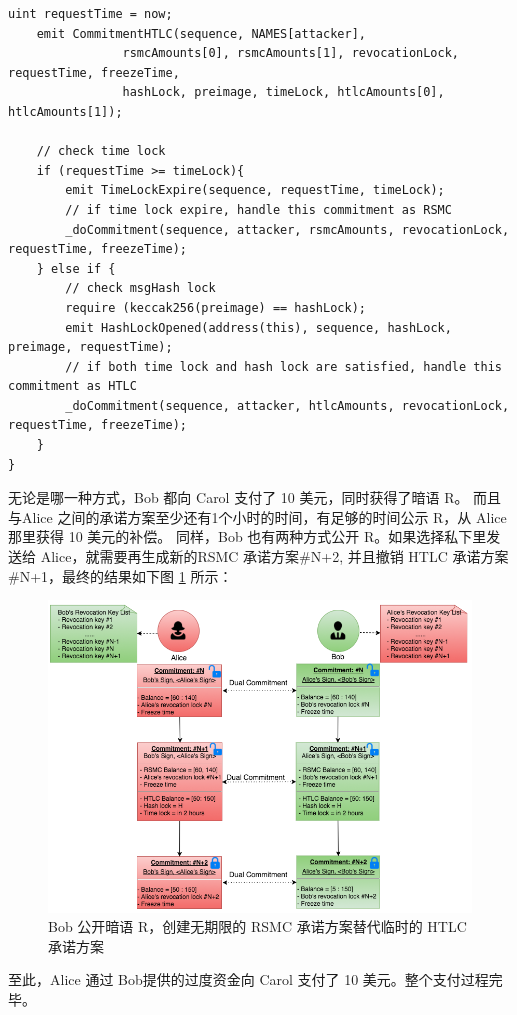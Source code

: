 \begin{appendices}
\begin{lstlisting}[caption={兑现HTLC共同承诺}, label={lst:cashHtlc}]
    uint requestTime = now;
    emit CommitmentHTLC(sequence, NAMES[attacker], 
                rsmcAmounts[0], rsmcAmounts[1], revocationLock, requestTime, freezeTime,
                hashLock, preimage, timeLock, htlcAmounts[0], htlcAmounts[1]);
    
    // check time lock
    if (requestTime >= timeLock){
        emit TimeLockExpire(sequence, requestTime, timeLock);
        // if time lock expire, handle this commitment as RSMC
        _doCommitment(sequence, attacker, rsmcAmounts, revocationLock, requestTime, freezeTime);
    } else if {
        // check msgHash lock
        require (keccak256(preimage) == hashLock);
        emit HashLockOpened(address(this), sequence, hashLock, preimage, requestTime);
        // if both time lock and hash lock are satisfied, handle this commitment as HTLC
        _doCommitment(sequence, attacker, htlcAmounts, revocationLock, requestTime, freezeTime);
    }
}
\end{lstlisting}

无论是哪一种方式，Bob 都向 Carol 支付了 10 美元，同时获得了暗语 R。
而且与Alice 之间的承诺方案至少还有1个小时的时间，有足够的时间公示 R，从 Alice 那里获得 10 美元的补偿。
同样，Bob 也有两种方式公开 R。如果选择私下里发送给 Alice，就需要再生成新的RSMC 承诺方案\#N+2, 并且撤销 HTLC 承诺方案\#N+1，最终的结果如下图 \ref{fig:A_alice_bob_3} 所示：
\begin{figure}[h!]
    \centering
    \includegraphics[width=12cm, keepaspectratio]{../images/alice_bob_3.png}
    \caption{Bob 公开暗语 R，创建无期限的 RSMC 承诺方案替代临时的 HTLC 承诺方案}
    \label{fig:A_alice_bob_3}
\end{figure}

至此，Alice 通过 Bob提供的过度资金向 Carol 支付了 10 美元。整个支付过程完毕。
\end{appendices}
